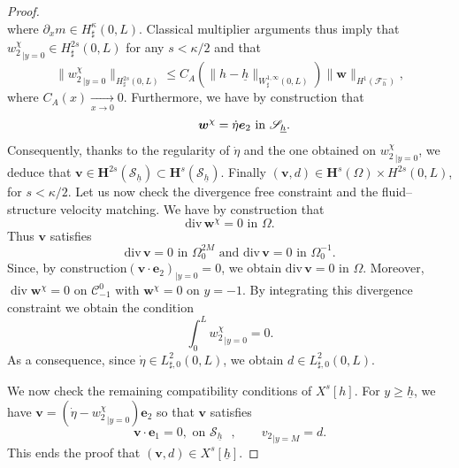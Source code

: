 \documentclass[11pt]{article}
\let\mathcal\mathscr
\theoremstyle{remark}
\theoremstyle{definition}
\newcommand{\vg}{\boldsymbol{v}}
\DeclareMathOperator{\DIV}{div}
\newcommand{\wg}{\boldsymbol{w}}
\newcommand{\BS}[1]{\boldsymbol{#1}}
\newcommand{\etap}{\dot{\eta}}
\newcommand{\hb}{{\underline{h}}}
\begin{document}
\begin{proof}
\[\]
where $\partial_x m\in H^\kappa_\sharp(0, L)$. Classical multiplier arguments thus imply that ${w_{2}^\chi}_{|{y=0}} \in H^{2s}_{\sharp}(0,L)$ for any $s < \kappa/2$ and that
\begin{equation} \label{eq.lapremieresurw2chi}
\|{w_{2}^\chi}_{|{y=0}}\|_{H^{2s}_{\sharp}(0,L)} \leq C_A(\|h-\hb\|_{W^{1,\infty}_{\sharp}(0,L)}) \|\wg\|_{H^1(\mathcal F^{-}_h)},
\end{equation}
where $C_{A}(x)\underset{x\to 0}{\to}0$.
Furthermore, we have by construction that
\[
\text{
\qquad $\wg^\chi= \etap \BS{e}_{2}$ in $\mathcal {S}_\hb$.}
\]
Consequently, thanks to the regularity of $\etap$ and the one obtained on ${{w}^\chi_{2}}_{|{y=0}}$, we deduce that $\vg\in \BS{H}^{2s}(\mathcal {S}_\hb)\subset \BS{H}^{s}(\mathcal {S}_\hb)$.
Finally $(\vg, d)\in \BS{H}^s(\Omega)\times H^{2s}(0, L)$, for $s<\kappa/2$.
Let us now check the divergence free constraint and the fluid--structure velocity matching.
We have by construction that
\[
\text{
$\text{div}\,\wg^\chi =0$ in $\Omega$.}
\]
Thus $\vg$ satisfies
\[
\text{
$\text{div}\,\vg =0$ in $\Omega^{2M}_{0}$ and $\text{div}\,\vg =0$ in $\Omega^{-1}_{0}$.}
\]
Since, by construction$(\vg\cdot\BS{e}_{2})_{|{y=0}}=0$, we obtain $\text{div}\,\vg =0$ in $\Omega$.
Moreover, $\DIV \wg^{\chi} = 0$ on $\mathcal C_{-1}^0$ with $\wg^{\chi} = 0$ on $y=-1$.
By integrating this divergence constraint we obtain the condition
\[
\int_{0}^L {w_{2}^\chi}_{|{y=0}} = 0.
\]
As a consequence, since $\dot\eta\in L^2_{\sharp,0}(0,L)$, we obtain $d \in L^2_{\sharp,0}(0,L)$.

We now check the remaining compatibility conditions of $X^s[h]$. For $y \geq \hb$, we have $\vg = ( \dot{\eta} - {w_{2}^\chi}_{|{y=0}}) \BS{e}_2$ so that $\vg$ satisfies
\[
\vg \cdot \BS{e}_1 = 0, \text{ on $\mathcal S_{\hb}$ }, \qquad {v_2}_{|{y=M}} = d.
\]
This ends the proof that $(\vg,d) \in X^s[\hb]$.


\end{proof}
\end{document}
